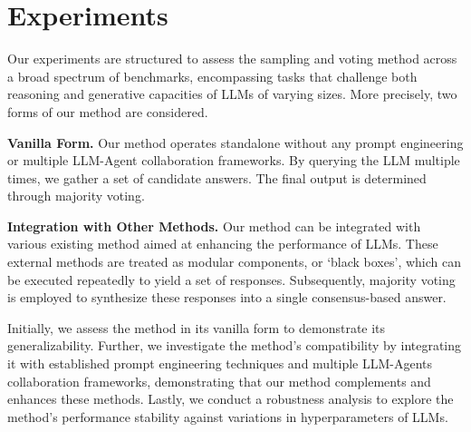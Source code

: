 \section{Experiments}


Our experiments are structured to assess the sampling and voting method across a broad spectrum of benchmarks, encompassing tasks that challenge both reasoning and generative capacities of LLMs of varying sizes. More precisely, two forms of our method are considered.

\textbf{Vanilla Form.} Our method operates standalone without any prompt engineering or multiple LLM-Agent collaboration frameworks. By querying the LLM multiple times, we gather a set of candidate answers. The final output is determined through majority voting.

\textbf{Integration with Other Methods.} Our method can be integrated with various existing method aimed at enhancing the performance of LLMs. These external methods are treated as modular components, or `black boxes', which can be executed repeatedly to yield a set of responses. Subsequently, majority voting is employed to synthesize these responses into a single consensus-based answer.

Initially, we assess the method in its vanilla form to demonstrate its generalizability. Further, we investigate the method's compatibility by integrating it with established prompt engineering techniques and multiple LLM-Agents collaboration frameworks, demonstrating that our method complements and enhances these methods. Lastly, we conduct a robustness analysis to explore the method's performance stability against variations in hyperparameters of LLMs.

